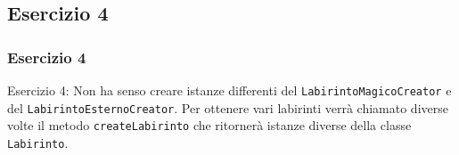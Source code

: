 \documentclass{beamer}
\begin{document}
\subsection{Esercizio 4}
\begin{frame}
\frametitle{Esercizio 4}
\begin{framed}
Esercizio 4: Non ha senso creare istanze differenti del \texttt{LabirintoMagicoCreator} e del \texttt{LabirintoEsternoCreator}. Per ottenere vari labirinti verr\`a chiamato diverse volte il metodo \texttt{createLabirinto} che ritorner\`a istanze diverse della classe \texttt{Labirinto}.
\end{framed}
\end{frame}




\end{document}

